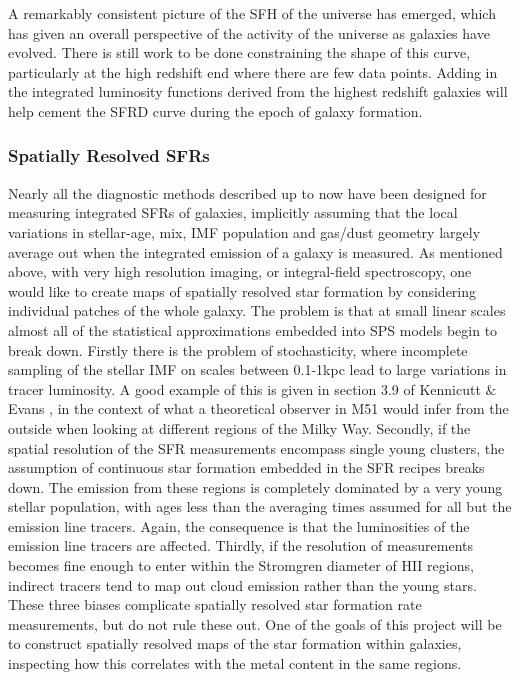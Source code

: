 \documentclass{literature}
\begin{document}
A remarkably consistent picture of the SFH of the universe has emerged, which has given an overall perspective of the activity of the universe as galaxies have evolved. There is still work to be done constraining the shape of this curve, particularly at the high redshift end where there are few data points. Adding in the integrated luminosity functions derived from the highest redshift galaxies will help cement the SFRD curve during the epoch of galaxy formation. 

\subsubsection{Spatially Resolved SFRs}\label{subsubsec:spat_res}
Nearly all the diagnostic methods described up to now have been designed for measuring integrated SFRs of galaxies, implicitly assuming that the local variations in stellar-age, mix, IMF population and gas/dust geometry largely average out when the integrated emission of a galaxy is measured. As mentioned above, with very high resolution imaging, or integral-field spectroscopy, one would like to create maps of spatially resolved star formation by considering individual patches of the whole galaxy. The problem is that at small linear scales almost all of the statistical approximations embedded into SPS models begin to break down. Firstly there is the problem of stochasticity, where incomplete sampling of the stellar IMF on scales between 0.1-1kpc lead to large variations in tracer luminosity. A good example of this is given in section 3.9 of Kennicutt $\&$ Evans \citep{Kennicutt_2012}, in the context of what a theoretical observer in M51 would infer from the outside when looking at different regions of the Milky Way. Secondly, if the spatial resolution of the SFR measurements encompass single young clusters, the assumption of continuous star formation embedded in the SFR recipes breaks down. The emission from these regions is completely dominated by a very young stellar population, with ages less than the averaging times assumed for all but the emission line tracers. Again, the consequence is that the luminosities of the emission line tracers are affected. Thirdly, if the resolution of measurements becomes fine enough to enter within the Stromgren diameter of HII regions, indirect tracers tend to map out cloud emission rather than the young stars. \\ 

These three biases complicate spatially resolved star formation rate measurements, but do not rule these out. One of the goals of this project will be to construct spatially resolved maps of the star formation within galaxies, inspecting how this correlates with the metal content in the same regions.  
\end{document}

